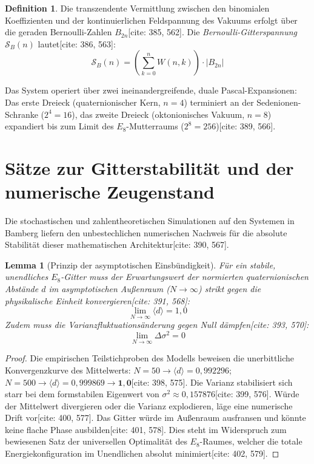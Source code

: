 \documentclass[11pt,a4paper]{article}
\newcommand{\Eoct}{E_8}
\newtheorem{lemma}[theorem]{Lemma}
\theoremstyle{definition}
\newtheorem{definition}[theorem]{Definition}
\begin{document}
	\begin{definition}
		Die transzendente Vermittlung zwischen den binomialen Koeffizienten und der kontinuierlichen Feldspannung des Vakuums erfolgt über die geraden Bernoulli-Zahlen $B_{2n}$[cite: 385, 562]. Die \textit{Bernoulli-Gitterspannung} $\mathcal{S}_B(n)$ lautet[cite: 386, 563]:
		\begin{equation}
			\mathcal{S}_B(n) = \left( \sum_{k=0}^n W(n,k) \right) \cdot |B_{2n}|
		\end{equation}
	\end{definition}
	
	Das System operiert über zwei ineinandergreifende, duale Pascal-Expansionen: Das erste Dreieck (quaternionischer Kern, $n=4$) terminiert an der Sedenionen-Schranke ($2^4=16$), das zweite Dreieck (oktonionisches Vakuum, $n=8$) expandiert bis zum Limit des $E_8$-Mutterraums ($2^8=256$)[cite: 389, 566].
	
	\section{Sätze zur Gitterstabilität und der numerische Zeugenstand}
	
	Die stochastischen und zahlentheoretischen Simulationen auf den Systemen in Bamberg liefern den unbestechlichen numerischen Nachweis für die absolute Stabilität dieser mathematischen Architektur[cite: 390, 567].
	
	\begin{lemma}[Prinzip der asymptotischen Einsbündigkeit]
		Für ein stabile, unendliches $\Eoct$-Gitter muss der Erwartungswert der normierten quaternionischen Abstände $d$ im asymptotischen Außenraum ($N \rightarrow \infty$) strikt gegen die physikalische Einheit konvergieren[cite: 391, 568]:
		\begin{equation}
			\lim_{N \rightarrow \infty} \langle d \rangle = 1{,}0
		\end{equation}
		Zudem muss die Varianzfluktuationsänderung gegen Null dämpfen[cite: 393, 570]:
		\begin{equation}
			\lim_{N \rightarrow \infty} \Delta \sigma^2 = 0
		\end{equation}
	\end{lemma}
	
	\begin{proof}
		Die empirischen Teilstichproben des Modells beweisen die unerbittliche Konvergenzkurve des Mittelwerts: $N=50 \rightarrow \langle d \rangle = 0{,}992296$; $N=500 \rightarrow \langle d \rangle = 0{,}999869 \rightarrow \mathbf{1{,}0}$[cite: 398, 575]. Die Varianz stabilisiert sich starr bei dem formstabilen Eigenwert von $\sigma^2 \approx 0{,}157876$[cite: 399, 576]. Würde der Mittelwert divergieren oder die Varianz explodieren, läge eine numerische Drift vor[cite: 400, 577]. Das Gitter würde im Außenraum ausfransen und könnte keine flache Phase ausbilden[cite: 401, 578]. Dies steht im Widerspruch zum bewiesenen Satz der universellen Optimalität des $\Eoct$-Raumes, welcher die totale Energiekonfiguration im Unendlichen absolut minimiert[cite: 402, 579].
	\end{proof}
	
\end{document}
